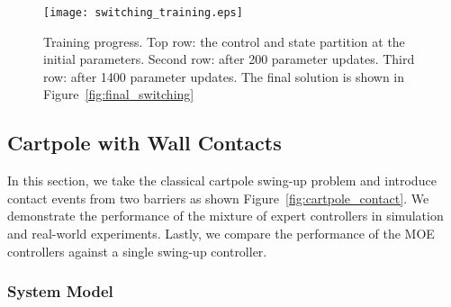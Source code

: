 \begin{figure}[H]
    \centering
    \texttt{[image: switching\_training.eps]}
    \caption{Training progress. Top row: the control and state partition at the
    initial parameters. Second row: after 200 parameter updates. Third row:
    after 1400 parameter updates. The final solution is shown in
    Figure~\ref{fig:final_switching}}
    \label{fig:switching_training}
\end{figure} 
\subsection{Cartpole with Wall Contacts}
\label{ssec:cartpole_with_walls}

In this section, we take the classical cartpole swing-up problem and introduce
contact events from two barriers as shown Figure~\ref{fig:cartpole_contact}. 
%
We demonstrate the performance of the mixture of expert controllers in
simulation and real-world experiments.
%
Lastly, we compare the performance of the MOE controllers against
a single swing-up controller. 


\subsubsection{System Model}
\label{sssec:cartpole_model}

